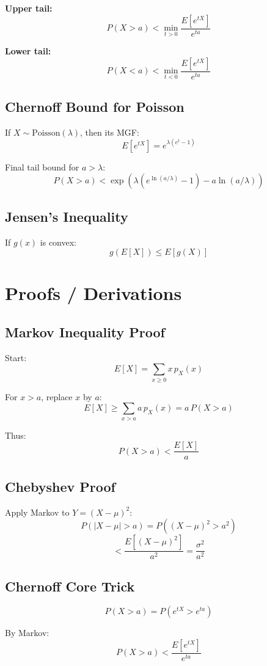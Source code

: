 \documentclass[11pt]{article}
\begin{document}
\textbf{Upper tail:}
\[
P(X > a) < \min_{t>0} \frac{E[e^{tX}]}{e^{ta}}
\]

\textbf{Lower tail:}
\[
P(X < a) < \min_{t<0} \frac{E[e^{tX}]}{e^{ta}}
\]

\subsection*{Chernoff Bound for Poisson}

If $X\sim\text{Poisson}(\lambda)$, then its MGF:
\[
E[e^{tX}] = e^{\lambda(e^t - 1)}
\]

Final tail bound for $a > \lambda$:
\[
P(X > a) < \exp\!\left(\lambda(e^{\ln(a/\lambda)} - 1) - a\ln(a/\lambda)\right)
\]

\subsection*{Jensen's Inequality}
If $g(x)$ is convex:
\[
g(E[X]) \le E[g(X)]
\]

\section{Proofs / Derivations}

\subsection*{Markov Inequality Proof}

Start:
\[
E[X] = \sum_{x\ge 0} x\, p_X(x)
\]

For $x>a$, replace $x$ by $a$:
\[
E[X] \ge \sum_{x>a} a\, p_X(x) = a\,P(X>a)
\]

Thus:
\[
P(X>a) < \frac{E[X]}{a}
\]

\subsection*{Chebyshev Proof}

Apply Markov to $Y = (X-\mu)^2$:
\[
P(|X-\mu|>a) = P((X-\mu)^2 > a^2)
\]
\[
< \frac{E[(X-\mu)^2]}{a^2} = \frac{\sigma^2}{a^2}
\]

\subsection*{Chernoff Core Trick}

\[
P(X>a) = P(e^{tX} > e^{ta})
\]

By Markov:
\[
P(X>a) < \frac{E[e^{tX}]}{e^{ta}}
\]
\end{document}
